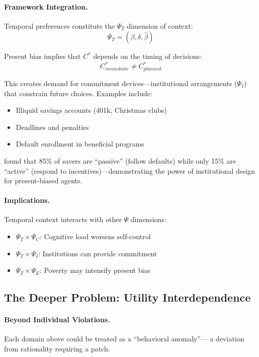\paragraph{Framework Integration.}
Temporal preferences constitute the $\Psi_T$ dimension of context:
\begin{equation}
  \Psi_T = (\beta, \delta, \hat{\beta})
\end{equation}

Present bias implies that $C^*$ depends on the timing of decisions:
\begin{equation}
  C^*_{immediate} \neq C^*_{planned}
\end{equation}

This creates demand for commitment devices---institutional arrangements ($\Psi_I$)
that constrain future choices. Examples include:
\begin{itemize}
  \item Illiquid savings accounts (401k, Christmas clubs)
  \item Deadlines and penalties
  \item Default enrollment in beneficial programs \citep{madrian2001}
\end{itemize}

\citet{chetty2014} found that 85\% of savers are ``passive'' (follow defaults)
while only 15\% are ``active'' (respond to incentives)---demonstrating
the power of institutional design for present-biased agents.

\paragraph{Implications.}
Temporal context interacts with other $\Psi$ dimensions:
\begin{itemize}
  \item $\Psi_T \times \Psi_C$: Cognitive load worsens self-control
  \item $\Psi_T \times \Psi_I$: Institutions can provide commitment
  \item $\Psi_T \times \Psi_E$: Poverty may intensify present bias
\end{itemize}

\subsection{The Deeper Problem: Utility Interdependence}

\paragraph{Beyond Individual Violations.}
Each domain above could be treated as a ``behavioral anomaly''---
a deviation from rationality requiring a patch.

